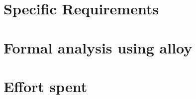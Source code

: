 \documentclass{config/PoliMi3i_thesis}
\begin{document}
\chapter{Specific Requirements}


\chapter{Formal analysis using alloy}


\chapter{Effort spent}





\listoffigures
\listoftables

\cleardoublepage
\end{document}
